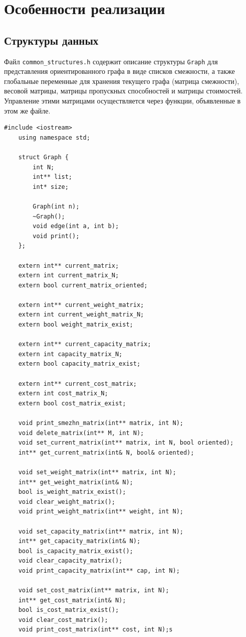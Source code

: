 \section{Особенности реализации}

\subsection{Структуры данных}
Файл \texttt{common\_structures.h} содержит описание структуры \texttt{Graph} для представления ориентированного графа в виде списков смежности, а также глобальные переменные для хранения текущего графа (матрица смежности), весовой матрицы, матрицы пропускных способностей и матрицы стоимостей. Управление этими матрицами осуществляется через функции, объявленные в этом же файле.

\begin{lstlisting}[caption=common\_structures.h]
	#include <iostream>
	using namespace std;
	
	struct Graph {
		int N;
		int** list;
		int* size;
		
		Graph(int n);
		~Graph();
		void edge(int a, int b);
		void print();
	};
	
	extern int** current_matrix;
	extern int current_matrix_N;
	extern bool current_matrix_oriented;
	
	extern int** current_weight_matrix;
	extern int current_weight_matrix_N;
	extern bool weight_matrix_exist;
	
	extern int** current_capacity_matrix;
	extern int capacity_matrix_N;
	extern bool capacity_matrix_exist;
	
	extern int** current_cost_matrix;
	extern int cost_matrix_N;
	extern bool cost_matrix_exist;
	
	void print_smezhn_matrix(int** matrix, int N);
	void delete_matrix(int** M, int N);
	void set_current_matrix(int** matrix, int N, bool oriented);
	int** get_current_matrix(int& N, bool& oriented);
	
	void set_weight_matrix(int** matrix, int N);
	int** get_weight_matrix(int& N);
	bool is_weight_matrix_exist();
	void clear_weight_matrix();
	void print_weight_matrix(int** weight, int N);
	
	void set_capacity_matrix(int** matrix, int N);
	int** get_capacity_matrix(int& N);
	bool is_capacity_matrix_exist();
	void clear_capacity_matrix();
	void print_capacity_matrix(int** cap, int N);
	
	void set_cost_matrix(int** matrix, int N);
	int** get_cost_matrix(int& N);
	bool is_cost_matrix_exist();
	void clear_cost_matrix();
	void print_cost_matrix(int** cost, int N);s
\end{lstlisting}

